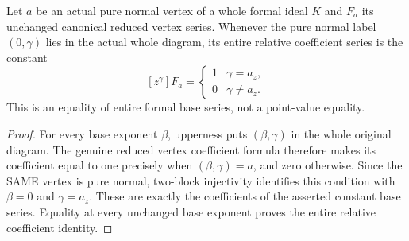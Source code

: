 \begin{theorem}
\label{hir:actual-pure-normal-reduced-diagram-coefficients}
\leanok
Let $a$ be an actual pure normal vertex of a whole formal ideal $K$ and
$F_a$ its unchanged canonical reduced vertex series. Whenever the pure normal
label $(0,\gamma)$ lies in the actual whole diagram, its entire relative
coefficient series is the constant
\[
 [z^\gamma]F_a=\begin{cases}1&\gamma=a_z,\\0&\gamma\ne a_z.\end{cases}
\]
This is an equality of entire formal base series, not a point-value equality.
\end{theorem}
\begin{proof}
For every base exponent $\beta$, upperness puts $(\beta,\gamma)$ in the
whole original diagram. The genuine reduced vertex coefficient formula
therefore makes its coefficient equal to one precisely when
$(\beta,\gamma)=a$, and zero otherwise. Since the SAME vertex is pure
normal, two-block injectivity identifies this condition with
$\beta=0$ and $\gamma=a_z$. These are exactly the coefficients of the
asserted constant base series. Equality at every unchanged base exponent
proves the entire relative coefficient identity.
\end{proof}


